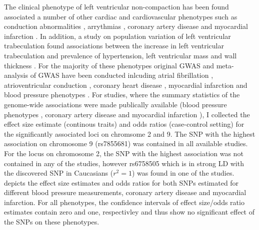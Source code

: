 The clinical phenotype of left ventricular non-compaction has been found associated a number of other cardiac and cardiovascular phenotypes such as conduction abnormalities \citep{Yousef2009}, arrythmias \citep{Ritter1997,Oechslin2000,Yousef2009}, coronary artery disease \citep{Ritter1997,Junga1999,Jenni2002,Soler2002} and myocardial infarction \citep{Swinkels2007,Toufan2012,Guvens2012}. In addition, a study on population variation of left ventricular trabeculation found associations between the increase in left ventricular trabeculation and prevalence of hypertension, left ventricular mass and wall thickness \citep{Captur2015}. For the majority of these phenotypes original GWAS and meta-analysis of GWAS have been conducted inlcuding atrial fibrillation \citep{Gudbjartsson2007,Christophersen2017}, atrioventricular conduction \citep{Denny2010}, coronary heart disease \citep{Schunkert2011,Lee2013a,Nikpay2015}, myocardial infarction \citep{Kathiresan2009,Hirokawa2015,Nikpay2015,Dehghan2016} and blood pressure phenotypes \citep{Ehret2011,Wain2011}. For studies, where the summary statistics of the genome-wide associations were made publically available (blood pressure phenotypes \citep{Ehret2011,Wain2011}, coronary artery disease \citep{Schunkert2011} and myocardial infarction \citep{Nikpay2015}), I collected the effect size estimate (continous traits) and odds ratios (case-control setting) for the significantly associated loci on chromsome 2 and 9. The SNP with the highest association on chromosome 9 (rs7855681) was contained in all available studies. For the locus on chromosome 2, the SNP with the highest association was not contained in any of the studies, however rs6758505 which is in strong LD with the discovered SNP in Caucasians (\(r^2=1\)) was found in one of the studies.  depicts the effect size estimates and odds ratios for both SNPs estimated for different blood pressure measurements, coronary artery disease and myocardial infarction. For all phenotypes, the confidence intervals of effect size/odds ratio estimates contain zero and one, respectivley and thus show no significant effect of the SNPs on these phenotypes. 
%
